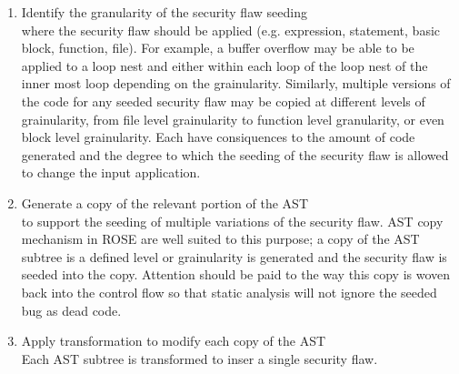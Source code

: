 \begin{enumerate}
\begin{enumerate}
               \item Identify the granularity of the security flaw seeding \\ 
                     where the security flaw should be applied
                     (e.g. expression, statement, basic block, function, file).
                     For example, a buffer overflow may be able to be applied to a loop
                     nest and either within each loop of the loop nest of the inner most
                     loop depending on the grainularity.  Similarly, multiple versions
                     of the code for any seeded security flaw may be copied at different
                     levels of grainularity, from file level grainularity to function
                     level granularity, or even block level grainularity.  Each have
                     consiquences to the amount of code generated and the degree to which
                     the seeding of the security flaw is allowed to change the input
                     application.
 
               \item Generate a copy of the relevant portion of the AST \\
                     to support the seeding of multiple variations of the security flaw.
                     AST copy mechanism in ROSE are well suited to this purpose; a copy of
                     the AST subtree is a defined level or grainularity is generated and
                     the security flaw is seeded into the copy. Attention should be
                     paid to the way this copy is woven back into the control flow so that
                     static analysis will not ignore the seeded bug as dead code.

               \item Apply transformation to modify each copy of the AST \\
                     Each AST subtree is transformed to inser a single security flaw.

            \end{enumerate}

\end{enumerate}


